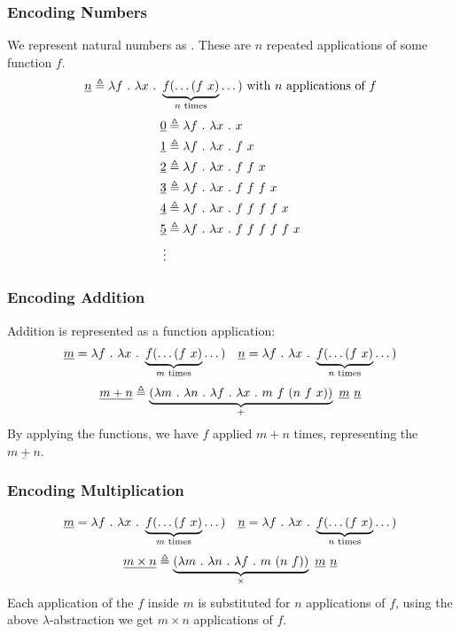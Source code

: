 \documentclass{report}
\begin{document}
\subsubsection*{Encoding Numbers}
We represent natural numbers as . These are $n$ repeated applications of some function $f$.
\[\underline{n} \triangleq \lambda f \ . \ \lambda x \ . \ \underbrace{f(\dots (f \ x)}_\text{$n$ times} \dots ) \text{  with $n$ applications of $f$}\]
\[\begin{split}
		\underline{0} &\triangleq \lambda f \ . \ \lambda x \ . \ x \\
		\underline{1} &\triangleq \lambda f \ . \ \lambda x \ . \ f \ x \\
		\underline{2} &\triangleq \lambda f \ . \ \lambda x \ . \ f \ f \ x \\
		\underline{3} &\triangleq \lambda f \ . \ \lambda x \ . \ f \ f \ f \ x \\
		\underline{4} &\triangleq \lambda f \ . \ \lambda x \ . \ f \ f \ f \ f \ x \\
		\underline{5} &\triangleq \lambda f \ . \ \lambda x \ . \ f \ f \ f \ f \ f \ x \\
		\vdots \\
	\end{split}\]

\subsubsection*{Encoding Addition}
Addition is represented as a function application:
\[\begin{matrix}
		\underline{m} =  \lambda f \ . \ \lambda x \ . \ \underbrace{f(\dots (f \ x)}_\text{$m$ times} \dots ) & \underline{n} =  \lambda f \ . \ \lambda x \ . \ \underbrace{f(\dots (f \ x)}_\text{$n$ times} \dots ) \\
	\end{matrix}\]
\[\underline{m + n} \triangleq \underbrace{(\lambda m \ . \ \lambda n \ . \ \lambda f \ . \ \lambda x \ . \ m \ f \ (n \ f \ x))}_+ \ \underline{m} \ \underline{n}\]
By applying the functions, we have $f$ applied $m + n$ times, representing the  $\underline{m+n}$.

\subsubsection*{Encoding Multiplication}
\[\begin{matrix}
		\underline{m} =  \lambda f \ . \ \lambda x \ . \ \underbrace{f(\dots (f \ x)}_\text{$m$ times} \dots ) & \underline{n} =  \lambda f \ . \ \lambda x \ . \ \underbrace{f(\dots (f \ x)}_\text{$n$ times} \dots ) \\
	\end{matrix}\]
\[\underline{m \times n} \triangleq \underbrace{(\lambda m \ . \ \lambda n \ . \ \lambda f \ . \ m \ (n \ f))}_\times \ \underline{m} \ \underline{n}\]
Each application of the $f$ inside $m$ is substituted for $n$ applications of $f$, using the above $\lambda$-abstraction we get $m \times n$ applications of $f$.
\end{document}
